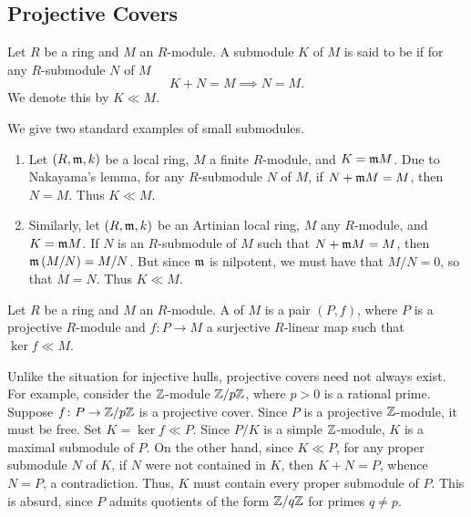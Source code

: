 \subsection{Projective Covers}

\begin{definition}
    Let $R$ be a ring and $M$ an $R$-module. A submodule $K$ of $M$ is said to be  if for any $R$-submodule $N$ of $M$ 
    \begin{equation*}
        K + N = M \implies N = M.
    \end{equation*}
    We denote this by $K\ll M$.
\end{definition}

We give two standard examples of small submodules.

\begin{enumerate}[label=(\roman*)]
    \item Let $(R,\mathfrak{m}, k)$ be a local ring, $M$ a finite $R$-module, and $K = \mathfrak{m} M$. Due to Nakayama's lemma, for any $R$-submodule $N$ of $M$, if $N + \mathfrak{m} M = M$, then $N = M$. Thus $K\ll M$.
    \item Similarly, let $(R,\mathfrak{m}, k)$ be an Artinian local ring, $M$ any $R$-module, and $K = \mathfrak{m} M$. If $N$ is an $R$-submodule of $M$ such that $N + \mathfrak{m} M = M$, then $\mathfrak{m}\left(M/N\right) = M/N$. But since $\mathfrak{m}$ is nilpotent, we must have that $M/N = 0$, so that $M = N$. Thus $K\ll M$.\label{artinian-example}
\end{enumerate}

\begin{definition}
    Let $R$ be a ring and $M$ an $R$-module. A  of $M$ is a pair $(P, f)$, where $P$ is a projective $R$-module and $f\colon P\to M$ a surjective $R$-linear map such that $\ker f\ll M$.
\end{definition}

\begin{remark}
    Unlike the situation for injective hulls, projective covers need not always exist. For example, consider the $\mathbb{Z}$-module $\mathbb{Z}/p\mathbb{Z}$, where $p > 0$ is a rational prime. Suppose $f\colon P\to\mathbb{Z}/p\mathbb{Z}$ is a projective cover. Since $P$ is a projective $\mathbb{Z}$-module, it must be free. Set $K = \ker f\ll P$. Since $P/K$ is a simple $\mathbb{Z}$-module, $K$ is a maximal submodule of $P$. On the other hand, since $K\ll P$, for any proper submodule $N$ of $K$, if $N$ were not contained in $K$, then $K + N = P$, whence $N = P$, a contradiction. Thus, $K$ must contain every proper submodule of $P$. This is absurd, since $P$ admits quotients of the form $\mathbb{Z}/q\mathbb{Z}$ for primes $q\ne p$.
\end{remark}

